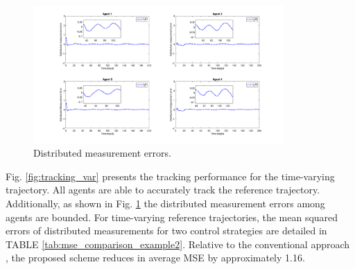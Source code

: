 \documentclass[journal,onecolumn]{IEEEtran}
\begin{document}
\begin{figure}[H]
    \centering
    \includegraphics[width=0.85\textwidth]{var_error.png}
    \caption{Distributed measurement errors.}
    \label{fig:error_var} %
\end{figure}

Fig. \ref{fig:tracking_var} presents the tracking performance for the time-varying trajectory. All agents are able to accurately track the reference trajectory. Additionally, as shown in Fig. \ref{fig:error_var} the distributed measurement errors among agents are bounded. For time-varying reference trajectories, the mean squared errors of distributed measurements for two control strategies are detailed in TABLE \ref{tab:mse_comparison_example2}. Relative to the conventional approach \cite{1}, the proposed scheme reduces in average MSE by approximately 1.16.

\begin{table}[H]
    \centering
    \caption{Mean square error comparison (Example 2)}
    \label{tab:mse_comparison_example2}
\end{table}
\end{document}
